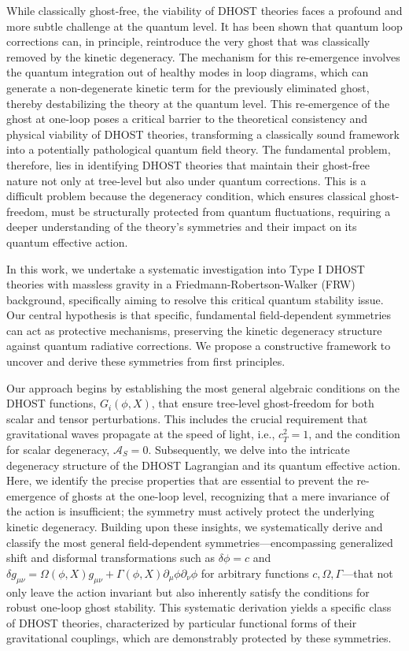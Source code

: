 \documentclass[twocolumn]{aastex631}
\begin{document}
While classically ghost-free, the viability of DHOST theories faces a profound and more subtle challenge at the quantum level. It has been shown that quantum loop corrections can, in principle, reintroduce the very ghost that was classically removed by the kinetic degeneracy. The mechanism for this re-emergence involves the quantum integration out of healthy modes in loop diagrams, which can generate a non-degenerate kinetic term for the previously eliminated ghost, thereby destabilizing the theory at the quantum level. This re-emergence of the ghost at one-loop poses a critical barrier to the theoretical consistency and physical viability of DHOST theories, transforming a classically sound framework into a potentially pathological quantum field theory. The fundamental problem, therefore, lies in identifying DHOST theories that maintain their ghost-free nature not only at tree-level but also under quantum corrections. This is a difficult problem because the degeneracy condition, which ensures classical ghost-freedom, must be structurally protected from quantum fluctuations, requiring a deeper understanding of the theory's symmetries and their impact on its quantum effective action.

In this work, we undertake a systematic investigation into Type I DHOST theories with massless gravity in a Friedmann-Robertson-Walker (FRW) background, specifically aiming to resolve this critical quantum stability issue. Our central hypothesis is that specific, fundamental field-dependent symmetries can act as protective mechanisms, preserving the kinetic degeneracy structure against quantum radiative corrections. We propose a constructive framework to uncover and derive these symmetries from first principles.

Our approach begins by establishing the most general algebraic conditions on the DHOST functions, $G_i(\phi, X)$, that ensure tree-level ghost-freedom for both scalar and tensor perturbations. This includes the crucial requirement that gravitational waves propagate at the speed of light, i.e., $c_T^2=1$, and the condition for scalar degeneracy, $\mathcal{A}_S=0$. Subsequently, we delve into the intricate degeneracy structure of the DHOST Lagrangian and its quantum effective action. Here, we identify the precise properties that are essential to prevent the re-emergence of ghosts at the one-loop level, recognizing that a mere invariance of the action is insufficient; the symmetry must actively protect the underlying kinetic degeneracy. Building upon these insights, we systematically derive and classify the most general field-dependent symmetries—encompassing generalized shift and disformal transformations such as $\delta\phi = c$ and $\delta g_{\mu\nu} = \Omega(\phi, X) g_{\mu\nu} + \Gamma(\phi, X) \partial_\mu\phi \partial_\nu\phi$ for arbitrary functions $c, \Omega, \Gamma$—that not only leave the action invariant but also inherently satisfy the conditions for robust one-loop ghost stability. This systematic derivation yields a specific class of DHOST theories, characterized by particular functional forms of their gravitational couplings, which are demonstrably protected by these symmetries.
\end{document}
